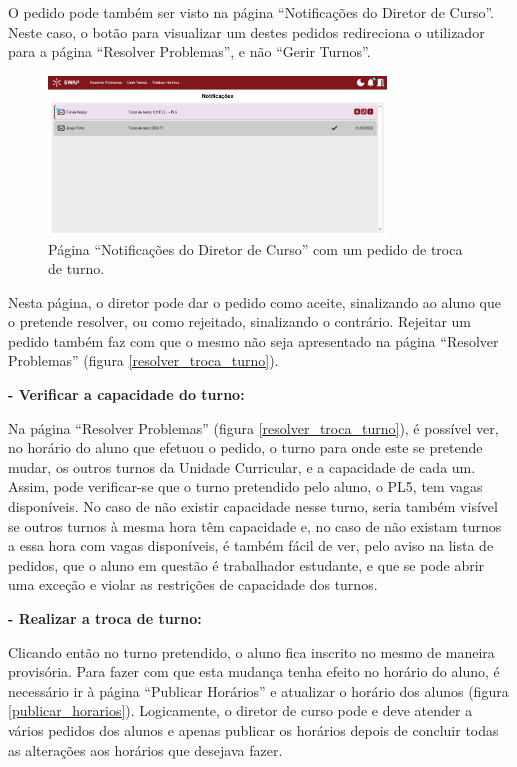\documentclass[12pt, a4paper]{article}
\begin{document}
O pedido pode também ser visto na página ``Notificações do Diretor de Curso''. Neste caso, o botão
para visualizar um destes pedidos redireciona o utilizador para a página ``Resolver Problemas'', e
não ``Gerir Turnos''.

\begin{figure}[H]
    \centering
    \includegraphics[width=0.8\textwidth]{res/manual/notificacao_troca_turno.png}
    \caption{Página ``Notificações do Diretor de Curso'' com um pedido de troca de turno.}
    \label{notificacao_troca_turno}
\end{figure}

Nesta página, o diretor pode dar o pedido como aceite, sinalizando ao aluno que o pretende resolver,
ou como rejeitado, sinalizando o contrário. Rejeitar um pedido também faz com que o mesmo não
seja apresentado na página ``Resolver Problemas'' (figura \ref{resolver_troca_turno}).

\textbf{- Verificar a capacidade do turno:}

Na página ``Resolver Problemas'' (figura \ref{resolver_troca_turno}), é possível ver, no horário do
aluno que efetuou o pedido, o turno para onde este se pretende mudar, os outros turnos da Unidade
Curricular, e a capacidade de cada um. Assim, pode verificar-se que o turno pretendido pelo aluno, o
PL5, tem vagas disponíveis. No caso de não existir capacidade nesse turno, seria também visível se
outros turnos à mesma hora têm capacidade e, no caso de não existam turnos a essa hora com vagas
disponíveis, é também fácil de ver, pelo aviso na lista de pedidos, que o aluno em questão é
trabalhador estudante, e que se pode abrir uma exceção e violar as restrições de capacidade dos
turnos.

\textbf{- Realizar a troca de turno:}

Clicando então no turno pretendido, o aluno fica inscrito no mesmo de maneira provisória. Para fazer
com que esta mudança tenha efeito no horário do aluno, é necessário ir à página
``Publicar Horários'' e atualizar o horário dos alunos (figura \ref{publicar_horarios}).
Logicamente, o diretor de curso pode e deve atender a vários pedidos dos alunos e apenas publicar os
horários depois de concluir todas as alterações aos horários que desejava fazer.
\end{document}
